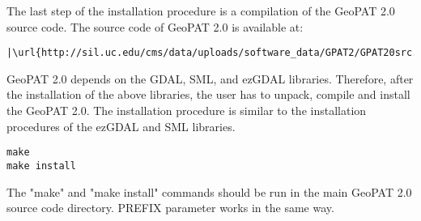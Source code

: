 The last step of the installation procedure is a compilation of the GeoPAT 2.0 source code.
The source code of GeoPAT 2.0 is available at:
\begin{lstlisting}[escapechar=|]
|\url{http://sil.uc.edu/cms/data/uploads/software_data/GPAT2/GPAT20src.tar.gz}|
\end{lstlisting}
GeoPAT 2.0 depends on the GDAL, SML, and ezGDAL libraries.
Therefore, after the installation of the above libraries, the user has to unpack, compile and install the GeoPAT 2.0.
The installation procedure is similar to the installation procedures of the ezGDAL and SML libraries.
\begin{lstlisting}
make
make install
\end{lstlisting}
The "make" and "make install" commands should be run in the main GeoPAT 2.0 source code directory.
PREFIX parameter works in the same way.

